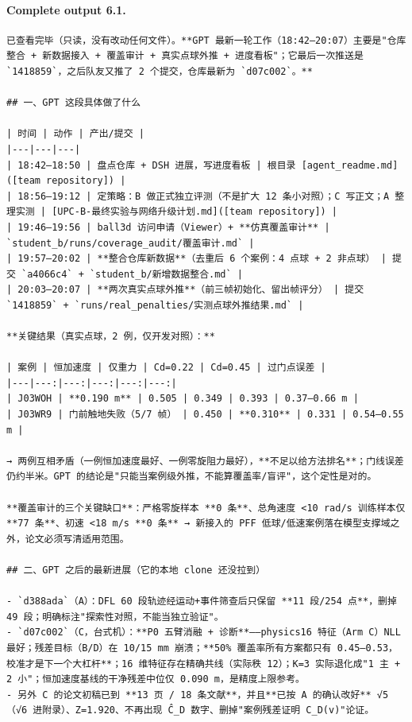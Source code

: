 \documentclass[UTF8,10pt]{ctexart}
\begin{document}
\paragraph{Complete output 6.1.}
\begin{Verbatim}[breaklines=true,breakanywhere=true,fontsize=\scriptsize,frame=single,framesep=2pt]
已查看完毕（只读，没有改动任何文件）。**GPT 最新一轮工作（18:42–20:07）主要是"仓库整合 + 新数据接入 + 覆盖审计 + 真实点球外推 + 进度看板"；它最后一次推送是 `1418859`，之后队友又推了 2 个提交，仓库最新为 `d07c002`。**

## 一、GPT 这段具体做了什么

| 时间 | 动作 | 产出/提交 |
|---|---|---|
| 18:42–18:50 | 盘点仓库 + DSH 进展，写进度看板 | 根目录 [agent_readme.md]([team repository]) |
| 18:56–19:12 | 定策略：B 做正式独立评测（不是扩大 12 条小对照）；C 写正文；A 整理实测 | [UPC-B-最终实验与网络升级计划.md]([team repository]) |
| 19:46–19:56 | ball3d 访问申请（Viewer）+ **仿真覆盖审计** | `student_b/runs/coverage_audit/覆盖审计.md` |
| 19:57–20:02 | **整合仓库新数据**（去重后 6 个案例：4 点球 + 2 非点球） | 提交 `a4066c4` + `student_b/新增数据整合.md` |
| 20:03–20:07 | **两次真实点球外推**（前三帧初始化、留出帧评分） | 提交 `1418859` + `runs/real_penalties/实测点球外推结果.md` |

**关键结果（真实点球，2 例，仅开发对照）：**

| 案例 | 恒加速度 | 仅重力 | Cd=0.22 | Cd=0.45 | 过门点误差 |
|---|---:|---:|---:|---:|---:|
| J03WOH | **0.190 m** | 0.505 | 0.349 | 0.393 | 0.37–0.66 m |
| J03WR9 | 门前触地失败（5/7 帧） | 0.450 | **0.310** | 0.331 | 0.54–0.55 m |

→ 两例互相矛盾（一例恒加速度最好、一例零旋阻力最好），**不足以给方法排名**；门线误差仍约半米。GPT 的结论是"只能当案例级外推，不能算覆盖率/盲评"，这个定性是对的。

**覆盖审计的三个关键缺口**：严格零旋样本 **0 条**、总角速度 <10 rad/s 训练样本仅 **77 条**、初速 <18 m/s **0 条** → 新接入的 PFF 低球/低速案例落在模型支撑域之外，论文必须写清适用范围。

## 二、GPT 之后的最新进展（它的本地 clone 还没拉到）

- `d388ada`（A）：DFL 60 段轨迹经运动+事件筛查后只保留 **11 段/254 点**，删掉 49 段；明确标注"探索性对照，不能当独立验证"。
- `d07c002`（C，台式机）：**P0 五臂消融 + 诊断**——physics16 特征（Arm C）NLL 最好；残差目标（B/D）在 10/15 mm 崩溃；**50% 覆盖率所有方案都只有 0.45–0.53，校准才是下一个大杠杆**；16 维特征存在精确共线（实际秩 12）；K=3 实际退化成"1 主 + 2 小"；恒加速度基线的干净残差中位仅 0.090 m，是精度上限参考。
- 另外 C 的论文初稿已到 **13 页 / 18 条文献**，并且**已按 A 的确认改好** √5（√6 进附录）、Z=1.920、不再出现 Ĉ_D 数字、删掉"案例残差证明 C_D(v)"论证。


\end{Verbatim}
\end{document}
